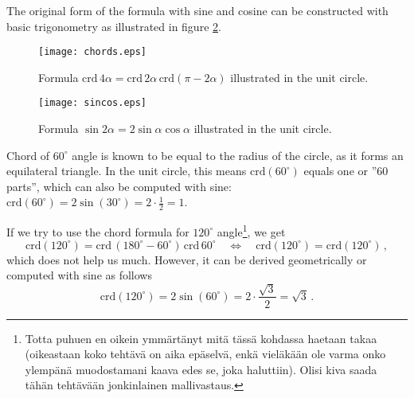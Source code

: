 \documentclass{article}
\begin{document}
The original form of the formula with sine and cosine can be constructed with basic trigonometry as illustrated in figure \ref{fig:sincos}.

\begin{figure}
    \centering
    \texttt{[image: chords.eps]}
    \caption{Formula $\text{crd}\,4\alpha = \text{crd}\,{2\alpha}\, \text{crd}{(\pi-2\alpha)}$ illustrated in the unit circle.}
    \label{fig:chords}
\end{figure}

\begin{figure}
    \centering
    \texttt{[image: sincos.eps]}
    \caption{Formula $\sin{2\alpha} = 2\sin{\alpha}\cos{\alpha}$ illustrated in the unit circle.}
    \label{fig:sincos}
\end{figure}

Chord of $60^{\circ}$ angle is known to be equal to the radius of the circle, as it forms an equilateral triangle. In the unit circle, this means $\text{crd}(60^{\circ})$ equals one or ''$60$ parts'', which can also be computed with sine: $\text{crd}(60^{\circ})=2\sin{(30^{\circ})}=2\cdot\frac{1}{2}=1$.

If we try to use the chord formula for $120^{\circ}$ angle\footnote{Totta puhuen en oikein ymmärtänyt mitä tässä kohdassa haetaan takaa (oikeastaan koko tehtävä on aika epäselvä, enkä vieläkään ole varma onko ylempänä muodostamani kaava edes se, joka haluttiin). Olisi kiva saada tähän tehtävään jonkinlainen mallivastaus.}, we get
\begin{equation*}
    \text{crd}(120^{\circ})=\text{crd}\,(180^{\circ}-60^{\circ})\,\text{crd}\,60^{\circ} \quad \Longleftrightarrow \quad \text{crd}(120^{\circ})=\text{crd}(120^{\circ})\,,
\end{equation*} 
which does not help us much. However, it can be derived geometrically or computed with sine as follows
\begin{equation*}
    \text{crd}(120^{\circ})=2\sin{(60^{\circ})}=2\cdot\frac{\sqrt{3}}{2}=\sqrt{3}\,.
\end{equation*}
\end{document}
